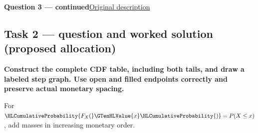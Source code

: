 \par\vspace{3mm}\secInicio[][sec:q3]

\clearpage
\textbf{Question 3 --- continued}\quad\hyperref[sec:q3]{Original description}

\subsection*{Task 2 --- question and worked solution (proposed allocation) }
\label{sol:q3t2}

\noindent\textbf{\boldmath Construct the complete CDF table, including both tails, and draw a labeled step graph. Use open and filled endpoints correctly and preserve actual monetary spacing.}\par\nopagebreak

For $\HLCumulativeProbability{F_X(}\GTenHLValue{x}\HLCumulativeProbability{)}=P(X\leq x)$, add masses in increasing monetary order.


